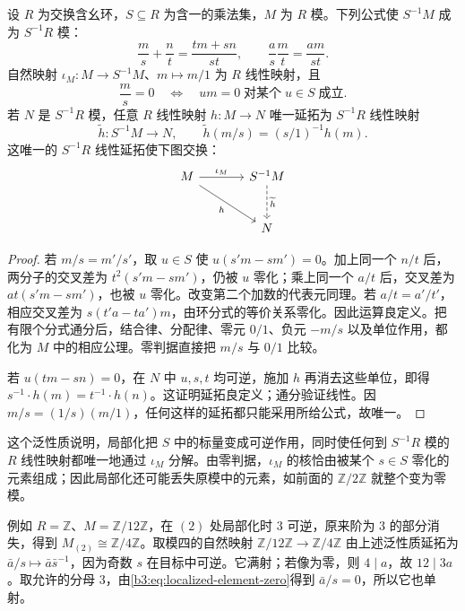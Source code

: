 \begin{proposition}\label{b3:prop:module-fraction-operations}
	设 \(R\) 为交换含幺环，\(S\subseteq R\) 为含一的乘法集，\(M\) 为 \(R\) 模。下列公式使 \(S^{-1}M\) 成为 \(S^{-1}R\) 模：
	\[
		\frac ms+\frac nt=\frac{tm+sn}{st},\qquad \frac as\frac mt=\frac{am}{st}.
	\]
	自然映射 \(\iota_M:M\rightarrow S^{-1}M\)、\(m\mapsto m/1\) 为 \(R\) 线性映射，且
	\begin{equation}\label{b3:eq:localized-element-zero}
		\frac ms=0\quad\Longleftrightarrow\quad um=0\;\text{对某个}\;u\in S\;\text{成立}.
	\end{equation}
	若 \(N\) 是 \(S^{-1}R\) 模，任意 \(R\) 线性映射 \(h:M\rightarrow N\) 唯一延拓为 \(S^{-1}R\) 线性映射
	\[
		\widetilde h:S^{-1}M\longrightarrow N,\qquad \widetilde h(m/s)=(s/1)^{-1}h(m).
	\]
	这唯一的 \(S^{-1}R\) 线性延拓使下图交换：
	\[
		\begin{tikzcd}[column sep=large,row sep=large]
			M\arrow[r,"\iota_M"]\arrow[dr,"h"'] &S^{-1}M\arrow[d,dashed,"\widetilde h"]\\
			&N
		\end{tikzcd}
	\]
\end{proposition}
\begin{proof}
	若 \(m/s=m'/s'\)，取 \(u\in S\) 使 \(u(s'm-sm')=0\)。加上同一个 \(n/t\) 后，两分子的交叉差为 \(t^2(s'm-sm')\)，仍被 \(u\) 零化；乘上同一个 \(a/t\) 后，交叉差为 \(at(s'm-sm')\)，也被 \(u\) 零化。改变第二个加数的代表元同理。若 \(a/t=a'/t'\)，相应交叉差为 \(s(t'a-ta')m\)，由环分式的等价关系零化。因此运算良定义。把有限个分式通分后，结合律、分配律、零元 \(0/1\)、负元 \(-m/s\) 以及单位作用，都化为 \(M\) 中的相应公理。零判据直接把 \(m/s\) 与 \(0/1\) 比较。

	若 \(u(tm-sn)=0\)，在 \(N\) 中 \(u,s,t\) 均可逆，施加 \(h\) 再消去这些单位，即得 \(s^{-1}\cdot h(m)=t^{-1}\cdot h(n)\)。这证明延拓良定义；通分验证线性。因 \(m/s=(1/s)(m/1)\)，任何这样的延拓都只能采用所给公式，故唯一。
\end{proof}

这个泛性质说明，局部化把 \(S\) 中的标量变成可逆作用，同时使任何到 \(S^{-1}R\) 模的 \(R\) 线性映射都唯一地通过 \(\iota_M\) 分解。由零判据，\(\iota_M\) 的核恰由被某个 \(s\in S\) 零化的元素组成；因此局部化还可能丢失原模中的元素，如前面的 \(\mathbb Z/2\mathbb Z\) 就整个变为零模。

\ProseParagraphBreak
例如 \(R=\mathbb Z\)、\(M=\mathbb Z/12\mathbb Z\)，在 \((2)\) 处局部化时 \(3\) 可逆，原来阶为 \(3\) 的部分消失，得到 \(M_{(2)}\cong\mathbb Z/4\mathbb Z\)。取模四的自然映射 \(\mathbb Z/12\mathbb Z\rightarrow\mathbb Z/4\mathbb Z\) 由上述泛性质延拓为 \(\bar a/s\mapsto\bar a\bar s^{-1}\)，因为奇数 \(s\) 在目标中可逆。它满射；若像为零，则 \(4\mid a\)，故 \(12\mid3a\)。取允许的分母 \(3\)，由\eqref{b3:eq:localized-element-zero}得到 \(\bar a/s=0\)，所以它也单射。

